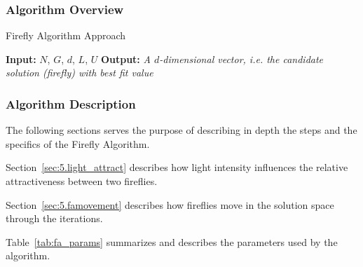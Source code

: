 \subsubsection{Algorithm Overview}

\begin{algorithm}
	\caption{Firefly Algorithm Approach} \label{alg:fa}
	\begin{algorithmic}
		\newline
		\textbf{Input:} $N$, $G$, $d$, $L$, $U$ \newline
		\textbf{Output:} \textit{A $d$-dimensional vector,
			i.e. the candidate solution (firefly) with best fit value}
						\EndIf
				\EndFor
			\EndFor
		\EndWhile
		\EndProcedure
	\end{algorithmic}
\end{algorithm}

\subsubsection{Algorithm Description}

The following sections serves the purpose of describing in depth the steps
and the specifics of the Firefly Algorithm.

Section~\ref{sec:5.light_attract} describes how light intensity influences
the relative attractiveness between two fireflies. 

Section~\ref{sec:5.famovement} describes how fireflies move in the solution
space through the iterations.

Table~\ref{tab:fa_params} summarizes and describes the parameters used by the algorithm.

